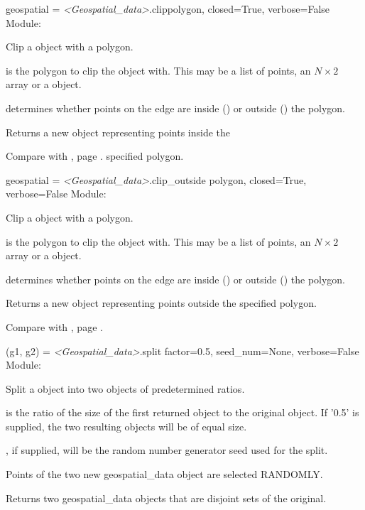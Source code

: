 \documentclass{manual}
\begin{document}
\label{ref:function_clip}
\begin{methoddesc}{geospatial = \emph{<Geospatial_data>}.clip}{polygon, closed=True, verbose=False}
Module: 

Clip a  object with a polygon.

 is the polygon to clip the  object with.
This may be a list of points, an $N \times 2$ array or a 
object.

 determines whether points on the  edge are inside ()
or outside () the polygon.

Returns a new  object representing points inside the

Compare with , page \pageref{ref:function_clip_outside}.
specified polygon.
\end{methoddesc}

\label{ref:function_clip_outside}
\begin{methoddesc}{geospatial = \emph{<Geospatial_data>}.clip_outside}
        {polygon, closed=True, verbose=False}
Module: 

Clip a  object with a polygon.

 is the polygon to clip the  object with.
This may be a list of points, an $N \times 2$ array or a 
object.

 determines whether points on the  edge are inside ()
or outside () the polygon.

Returns a new  object representing points outside the
specified polygon.

Compare with , page \pageref{ref:function_clip}.
\end{methoddesc}

\begin{methoddesc}{(g1, g2) = \emph{<Geospatial_data>}.split}
        {factor=0.5, seed_num=None, verbose=False}
Module: 

Split a  object into two objects of predetermined ratios.

 is the ratio of the size of the first returned object to the
original object.  If '0.5' is supplied, the two resulting objects will be
of equal size.

, if supplied, will be the random number generator seed used for
the split.

Points of the two new geospatial_data object are selected RANDOMLY.

Returns two geospatial_data objects that are disjoint sets of the original.
\end{methoddesc}
\end{document}
